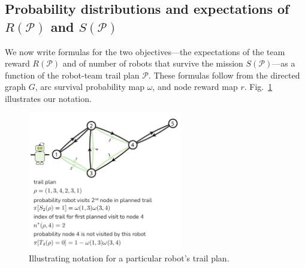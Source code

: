 \documentclass[11pt, oneside]{article}
\begin{document}
\subsection{Probability distributions and expectations of $R(\mathcal{P})$ and $S(\mathcal{P})$}
We now write formulas for the two objectives---the expectations of the team reward $R(\mathcal{P})$ and of number of robots that survive the mission $S(\mathcal{P})$---as a function of the robot-team trail plan $\mathcal{P}$. 
These formulas follow from the directed graph $G$, arc survival probability map $\omega$, and node reward map $r$. Fig.~\ref{fig:notation} illustrates our notation.

\begin{figure}[h!]
    \centering
    	\includegraphics[width=0.6\textwidth]{notation.pdf}
    \caption{Illustrating notation for a particular robot's trail plan.} \label{fig:notation}
\end{figure}
\end{document}
